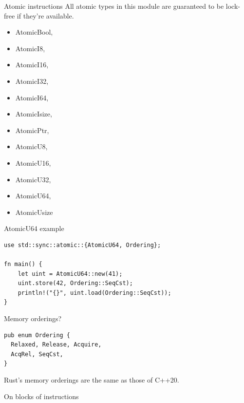 \documentclass{beamer}
\begin{document}
\begin{frame}[fragile]{Atomic instructions}
  All atomic types in this module are guaranteed to be lock-free if they're available.

  \vspace{15pt}
  \begin{minipage}[l]{0.45\textwidth}
    \begin{itemize}
      \item AtomicBool,
      \item AtomicI8,
      \item AtomicI16,
      \item AtomicI32,
      \item AtomicI64,
      \item AtomicIsize,
    \end{itemize}
  \end{minipage}
  \begin{minipage}[l]{0.45\textwidth}
    \begin{itemize}
      \item AtomicPtr,
      \item AtomicU8,
      \item AtomicU16,
      \item AtomicU32,
      \item AtomicU64,
      \item AtomicUsize
    \end{itemize}
  \end{minipage}
\end{frame}

\begin{frame}[fragile]{AtomicU64 example}
  \begin{verbatim}
use std::sync::atomic::{AtomicU64, Ordering};
  
fn main() {
    let uint = AtomicU64::new(41);
    uint.store(42, Ordering::SeqCst);
    println!("{}", uint.load(Ordering::SeqCst));
}
  \end{verbatim}

  Memory orderings?

  \begin{verbatim}
pub enum Ordering {
  Relaxed, Release, Acquire,
  AcqRel, SeqCst,
}
  \end{verbatim}

  Rust's memory orderings are the same as those of C++20.
\end{frame}

\begin{frame}[standout]
  On blocks of instructions
\end{frame}
\end{document}
